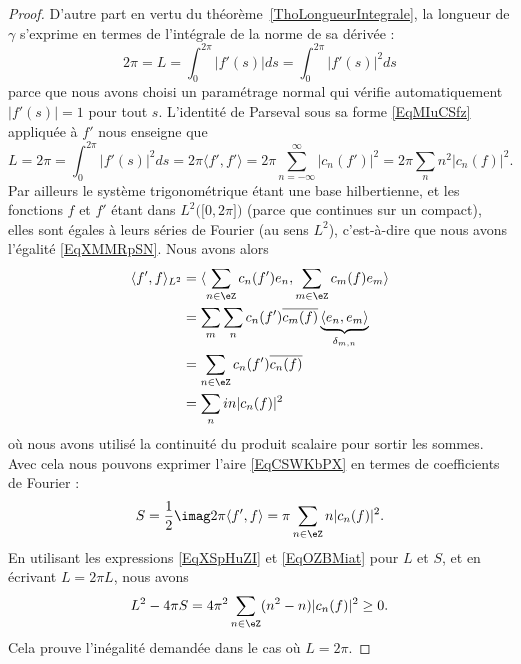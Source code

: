 \begin{proof}
    D'autre part en vertu du théorème~\ref{ThoLongueurIntegrale}, la longueur de \( \gamma\) s'exprime en termes de l'intégrale de la norme de sa dérivée :
    \begin{equation}
        2\pi=L=\int_0^{2\pi}| f'(s) |ds=\int_0^{2\pi}| f'(s) |^2ds
    \end{equation}
    parce que nous avons choisi un paramétrage normal qui vérifie automatiquement \( | f'(s) |=1\) pour tout \( s\). L'identité de Parseval sous sa forme \eqref{EqMIuCSfz} appliquée à \( f'\) nous enseigne que
    \begin{equation}        \label{EqXSpHuZI}
        L=2\pi=\int_0^{2\pi}| f'(s) |^2ds=2\pi\langle f', f'\rangle=2\pi\sum_{n=-\infty}^{\infty}| c_n(f') |^2=2\pi\sum_nn^2| c_n(f) |^2.
    \end{equation}
    Par ailleurs le système trigonométrique étant une base hilbertienne, et les fonctions \( f\) et \( f'\) étant dans \( L^2\big( \mathopen[ 0 , 2\pi \mathclose] \big)\) (parce que continues sur un compact), elles sont égales à leurs séries de Fourier (au sens \( L^2\)), c'est-à-dire que nous avons l'égalité \eqref{EqXMMRpSN}. Nous avons alors
    \begin{subequations}
        \begin{align}
            \langle f', f\rangle_{L^2} &=\langle \sum_{n\in \eZ}c_n(f')e_n, \sum_{m\in \eZ}c_m(f)e_m\rangle \\
            &=\sum_m\sum_nc_n(f')\overline{ c_m(f) }\underbrace{\langle e_n, e_m\rangle }_{\delta_{m,n}}\\
            &=\sum_{n\in \eZ}c_n(f')\overline{ c_n(f) }\\
            &=\sum_nin| c_n(f) |^2
        \end{align}
    \end{subequations}
    où nous avons utilisé la continuité du produit scalaire pour sortir les sommes. Avec cela nous pouvons exprimer l'aire \eqref{EqCSWKbPX} en termes de coefficients de Fourier :
    \begin{equation}    \label{EqOZBMiat}
        S=\frac{ 1 }{2}\imag2\pi\langle f', f\rangle =\pi\sum_{n\in \eZ}n| c_n(f) |^2.
    \end{equation}
    En utilisant les expressions \eqref{EqXSpHuZI} et \eqref{EqOZBMiat} pour \( L\) et \( S\), et en écrivant \( L=2\pi L\), nous avons
    \begin{equation}
        L^2-4\pi S=4\pi^2\sum_{n\in \eZ}(n^2-n)| c_n(f) |^2\geq 0.
    \end{equation}
    Cela prouve l'inégalité demandée dans le cas où \( L=2\pi\).


\end{proof}
